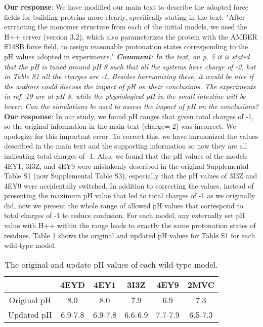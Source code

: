 \documentclass[9pt]{elife}
\begin{document}
\newline
\indent
{\bf Our response}: We have modified our main text to describe the adopted force fields for building proteins more clearly, specifically stating in the text:
"After extracting the monomer structure from each of the initial models, we used the H++ server (version 3.2), which also parameterizes the protein with the AMBER ff14SB force field, to assign reasonable protonation states corresponding to the pH values adopted in experiments."
\newline 
\newline
\indent
\textit{\textbf{Comment}:
In the text, on p. 5 it is stated that the pH is tuned around pH 8 such that all the systems have charge of -2, but in Table S1 all the charges are -1.  Besides harmonizing these, it would be nice if the authors could discuss the impact of pH on their conclusions.  The experiments in ref. 19 are at pH 8, while the physiological pH in the small intestine will be lower.  Can the simulations be used to assess the impact of pH on the conclusions?}
\newline
\indent 
{\bf Our response}: In our study, we found pH ranges that given total charges of -1, so the original information in the main text (charge=-2) was incorrect. We apologize for this important error.  To correct this, we have harmonized the values described in the main text and the supporting information so now they are all indicating total charges of -1. Also, we found that the pH values of the models 4EY1, 3I3Z, and 4EY9 were mistakenly described in the original Supplemental Table S1 (now Supplemental Table S3), especially that the pH values of 3I3Z and 4EY9 were accidentally switched. In addition to correcting the values, instead of presenting the maximum pH value that led to total charges of -1 as we originally did, now we present the whole range of allowed pH values that correspond to total charges of -1 to reduce confusion. For each model, any externally set pH value with H++ within the range leads to exactly the same protonation states of residues. Table \ref{pH} shows the original and updated pH values for Table S1 for each wild-type model. 

\begin{table}[H]
\centering
\begin{tabular}{|c|c|c|c|c|c|}
\hline
            & 4EYD    & 4EY1    & 3I3Z    & 4EY9    & 2MVC    \\ \hline
Original pH & 8.0     & 8.0     & 7.9     & 6.9     & 7.3     \\ \hline
Updated pH  & 6.9-7.8 & 6.9-7.8 & 6.6-6.9 & 7.7-7.9 & 6.5-7.3 \\ \hline
\end{tabular}
\caption{The original and update pH values of each wild-type model.}
\label{pH}
\end{table}
\end{document}

